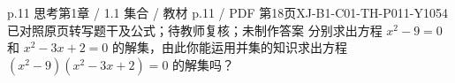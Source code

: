 \par\noindent\begin{minipage}{\linewidth}
\begin{bankitem}{p.11 思考}{第1章 / 1.1 集合 / 教材 p.11 / PDF 第18页}{XJ-B1-C01-TH-P011-Y1054}{已对照原页转写题干及公式；待教师复核；未制作答案}
分别求出方程 $x^2-9=0$ 和 $x^2-3x+2=0$ 的解集，由此你能运用并集的知识求出方程 $(x^2-9)(x^2-3x+2)=0$ 的解集吗？
\end{bankitem}
\end{minipage}\par\medskip
